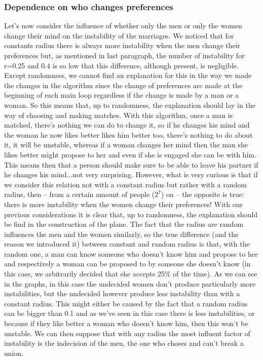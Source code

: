 \documentclass[11pt]{article}
\begin{document}
\subsubsection{Dependence on who changes preferences}
Let's now consider the influence of whether only the men or only the women change their mind on 
the instability of the marriages. We noticed that for constants radius there is always more instability 
when the men change their preferences but, as mentioned in last paragraph, the number of 
instability for r=0.25 and 0.4 is so low that this difference, although present, is negligible. Except 
randomness, we cannot find an explanation for this in the way we made the changes in the algorithm
since the change of preferences are made at the beginning of each main loop regardless if the 
change is made by a man or a woman. So this means that, up to randomness, the explanation should 
lay in the way of choosing and making matches. With this algorithm, once a man is matched, there’s 
nothing we can do to change it, so if he changes his mind and the woman he now likes better likes
him better too, there’s nothing to do about it, it will be unstable, whereas if a woman changes her 
mind then the man she likes better might propose to her and even if she is engaged she can be with 
him. This means then that a person should make sure to be able to leave his partner if he changes his 
mind...not very surprising. However, what is very curious is that if we consider this relation not with a 
constant radius but rather with a random radius, then -- from a certain amount of people ($2^{7}$) on --
the opposite is true: there is more instability when the women change their preferences! With our 
previous considerations it is clear that, up to randomness, the explanation should be find in the 
construction of the plane. The fact that the radius are random influences the men and the women 
similarly, so the true difference (and the reason we introduced it) between constant and random 
radius is that, with the random one, a man can know someone who doesn't know him and propose 
to her and respectively a woman can be proposed to by someone she doesn't know (in this case, we 
arbitrarily decided that she accepts 25\% of the time). As we can see in the graphs, in this case the 
undecided women don't produce particularly more instabilities, but the undecided however produce 
less instability than with a constant radius. This might either be caused by the fact that a random 
radius can be bigger than 0.1 and as we've seen in this case there is less instabilities, or because if 
they like better a woman who doesn’t know him, then this won’t be unstable. We can then suppose 
that with any radius the most influent factor of instability is the indecision of the men, the one who
choses and can't break a union.
\end{document}
